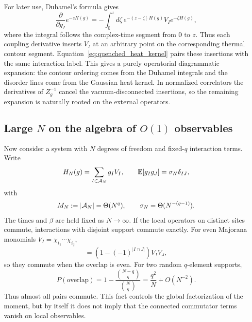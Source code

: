 \documentclass{article}
\theoremstyle{definition}
\begin{document}
For later use, Duhamel's formula gives
\begin{equation}
    \frac{\partial}{\partial g_I}e^{-zH(g)}
    =-\int_0^z d\zeta\,
    e^{-(z-\zeta)H(g)}V_Ie^{-\zeta H(g)},
    \label{eq:quenched_duhamel}
\end{equation}
where the integral follows the complex-time segment from $0$ to $z$. Thus each coupling derivative inserts $V_I$ at an arbitrary point on the corresponding thermal contour segment. Equation~\eqref{eq:quenched_heat_kernel} pairs these insertions with the same interaction label. This gives a purely operatorial diagrammatic expansion: the contour ordering comes from the Duhamel integrals and the disorder lines come from the Gaussian heat kernel. In normalized correlators the derivatives of $Z_g^{-1}$ cancel the vacuum-disconnected insertions, so the remaining expansion is naturally rooted on the external operators.

\subsection{Large $N$ on the algebra of $O(1)$ observables}

Now consider a system with $N$ degrees of freedom and fixed-$q$ interaction terms. Write
\begin{equation}
    H_N(g)=\sum_{I\in{\cal A}_N}g_IV_I,
    \qquad
    \mathbb E[g_Ig_J]=\sigma_N\delta_{IJ},
\end{equation}
with
\begin{equation}
    M_N:=|{\cal A}_N|=\Theta(N^q),
    \qquad
    \sigma_N=\Theta(N^{-(q-1)}).
    \label{eq:quenched_largeN_scaling}
\end{equation}
The times and $\beta$ are held fixed as $N\to\infty$. If the local operators on distinct sites commute, interactions with disjoint support commute exactly. For even Majorana monomials $V_I=\chi_{i_1}\cdots\chi_{i_q}$,
\begin{equation}
    [V_I,V_J]
    =\left(1-(-1)^{|I\cap J|}\right)V_IV_J,
\end{equation}
so they commute when the overlap is even. For two random $q$-element supports,
\begin{equation}
    P(\mathrm{overlap})
    =1-\frac{\binom{N-q}{q}}{\binom{N}{q}}
    =\frac{q^2}{N}+O(N^{-2}).
    \label{eq:quenched_overlap_probability}
\end{equation}
Thus almost all pairs commute. This fact controls the global factorization of the moment, but by itself it does not imply that the connected commutator terms vanish on local observables.
\end{document}
